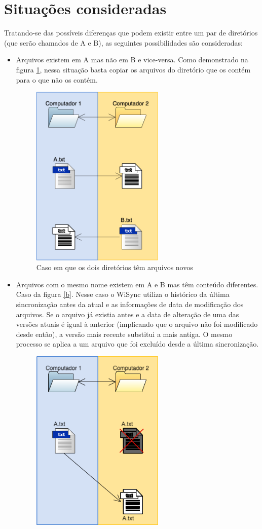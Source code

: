 \documentclass[12pt,a4paper]{ufpr}
\begin{document}
\section{Situações consideradas}
Tratando-se das possíveis diferenças que podem existir entre um par de diretórios (que serão chamados de A e B), as seguintes possibilidades são consideradas:
\begin{itemize}
  \item Arquivos existem em A mas não em B e vice-versa. Como demonstrado na figura \ref{a}, nessa situação basta copiar os arquivos do diretório que os contém para o que não os contém.
  \begin{figure}[h]
    \centering
    \includegraphics[width=180pt]{img/a.png}
    \caption{Caso em que os dois diretórios têm arquivos novos}
    \label{a}
  \end{figure}
  \item Arquivos com o mesmo nome existem em A e B mas têm conteúdo diferentes. Caso da figura \ref{b}. Nesse caso o WiSync utiliza o histórico da última sincronização antes da atual e as informações de data de modificação dos arquivos. Se o arquivo já existia antes e a data de alteração de uma das versões atuais é igual à anterior (implicando que o arquivo não foi modificado desde então), a versão mais recente substitui a mais antiga. O mesmo processo se aplica a um arquivo que foi excluído desde a última sincronização.
  \begin{figure}[h]
    \centering
    \includegraphics[width=180pt]{img/b.png}

\end{figure}
\end{itemize}
\end{document}
